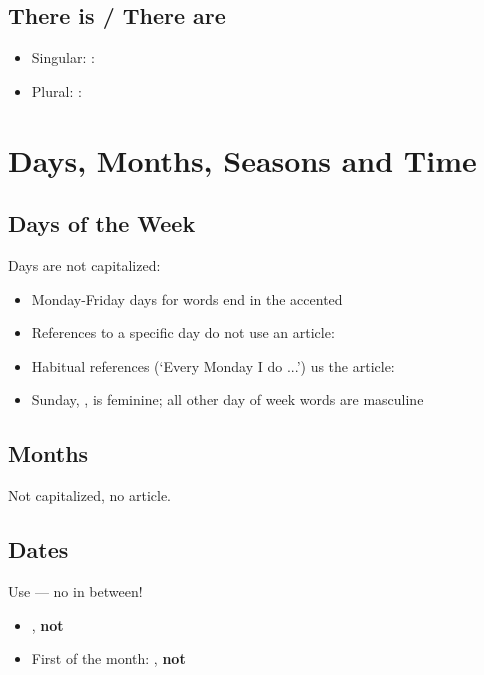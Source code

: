 \section{There is / There are}
\begin{itemize}[nosep]
    \item Singular:  : 
    \item Plural:  : 
\end{itemize}

\chapter{Days, Months, Seasons and Time}

\section{Days of the Week}
Days are not capitalized: 

\begin{itemize}[nosep]
    \item Monday-Friday days for words end in the accented 
    \item References to a specific day do not use an article: 
    \item Habitual references (`Every Monday I do ...') us the article: 
    \item Sunday, , is feminine; all other day of week words are masculine
\end{itemize}

\section{Months}
Not capitalized, no article. 

\section{Dates}
Use  — no  in between!

\begin{itemize}[nosep]
    \item {}, \textbf{not} 
    \item First of the month: , \textbf{not} 
\end{itemize}

